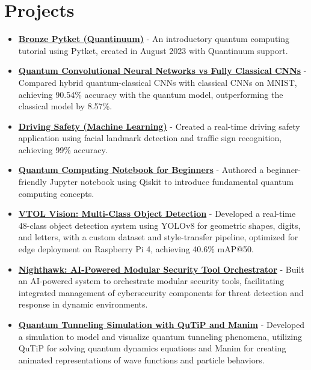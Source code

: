 \documentclass[11pt,a3paper]{moderncv}
\begin{document}
\begin{minipage}[t]{0.62\textwidth}
\section{Projects}
{\small
\newcommand{\project}[3]{
    \item \href{#2}{\textbf{#1}} - #3
}
\begin{itemize}
    \project
        {Bronze Pytket (Quantinuum)}
        {https://gitlab.com/clausia/bronze-pytket}
        {An introductory quantum computing tutorial using Pytket, created in August 2023 with Quantinuum support.}
    \project
        {Quantum Convolutional Neural Networks vs Fully Classical CNNs}
        {https://github.com/ahkatlio/QCNN-vs-CNN-Performance-Analysis}
        {Compared hybrid quantum-classical CNNs with classical CNNs on MNIST, achieving 90.54\% accuracy with the quantum model, outperforming the classical model by 8.57\%.}
    \project
        {Driving Safety (Machine Learning)}
        {https://github.com/ahkatlio/Driving_safety}
        {Created a real-time driving safety application using facial landmark detection and traffic sign recognition, achieving 99\% accuracy.}
    \project
        {Quantum Computing Notebook for Beginners}
        {https://github.com/ahkatlio/QHSO_Basics_of_Qiskit}
        {Authored a beginner-friendly Jupyter notebook using Qiskit to introduce fundamental quantum computing concepts.}
    \project
        {VTOL Vision: Multi-Class Object Detection}
        {https://github.com/ahkatlio/VTOLVision}
        {Developed a real-time 48-class object detection system using YOLOv8 for geometric shapes, digits, and letters, with a custom dataset and style-transfer pipeline, optimized for edge deployment on Raspberry Pi 4, achieving 40.6\% mAP@50.}
    \project
        {Nighthawk: AI-Powered Modular Security Tool Orchestrator}
        {https://github.com/ahkatlio/Nighthawk}
        {Built an AI-powered system to orchestrate modular security tools, facilitating integrated management of cybersecurity components for threat detection and response in dynamic environments.}
    \project
        {Quantum Tunneling Simulation with QuTiP and Manim}
        {https://github.com/ahkatlio/quantum-tunneling-sim-with-qutip-and-manim}
        {Developed a simulation to model and visualize quantum tunneling phenomena, utilizing QuTiP for solving quantum dynamics equations and Manim for creating animated representations of wave functions and particle behaviors.}
\end{itemize}
}

\vspace{2.0mm}

\end{minipage}
\end{document}
